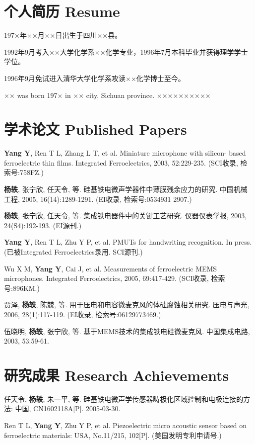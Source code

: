 
\begin{resume}

  \section*{个人简历 Resume}

197×年××月××日出生于四川××县。

1992年9月考入××大学化学系××化学专业，1996年7月本科毕业并获得理学学士学位。

1996年9月免试进入清华大学化学系攻读××化学博士至今。

×× was born 197× in ×× city, Sichuan province.
××××××××××

  \section*{学术论文 Published Papers}

  \begin{achievements}
    \item \textbf{Yang Y}, Ren T L, Zhang L T, et al. Miniature microphone with silicon- based ferroelectric thin films. Integrated Ferroelectrics, 2003, 52:229-235. (SCI收录, 检索号:758FZ.)
    \item \textbf{杨轶}, 张宁欣, 任天令, 等. 硅基铁电微声学器件中薄膜残余应力的研究. 中国机械工程, 2005, 16(14):1289-1291. (EI收录, 检索号:0534931 2907.)
    \item \textbf{杨轶}, 张宁欣, 任天令, 等. 集成铁电器件中的关键工艺研究. 仪器仪表学报, 2003, 24(S4):192-193. (EI源刊.)
    \item \textbf{Yang Y}, Ren T L, Zhu Y P, et al. PMUTs for handwriting recognition. In press. (已被Integrated Ferroelectrics录用. SCI源刊.)
    \item Wu X M, \textbf{Yang Y}, Cai J, et al. Measurements of ferroelectric MEMS microphones. Integrated Ferroelectrics, 2005, 69:417-429. (SCI收录, 检索号:896KM.)
    \item 贾泽, \textbf{杨轶}, 陈兢, 等. 用于压电和电容微麦克风的体硅腐蚀相关研究. 压电与声光, 2006, 28(1):117-119. (EI收录, 检索号:06129773469.)
    \item 伍晓明, \textbf{杨轶}, 张宁欣, 等. 基于MEMS技术的集成铁电硅微麦克风. 中国集成电路, 2003, 53:59-61.
  \end{achievements}
  
  
  \section*{研究成果 Research Achievements}
  
\begin{achievements}
 \item 任天令, \textbf{杨轶}, 朱一平, 等. 硅基铁电微声学传感器畴极化区域控制和电极连接的方法: 中国, CN1602118A[P]. 2005-03-30.
\item Ren T L, \textbf{Yang Y}, Zhu Y P, et al. Piezoelectric micro acoustic sensor based on ferroelectric materials: USA, No.11/215, 102[P]. (美国发明专利申请号.)
\end{achievements}


\end{resume}
